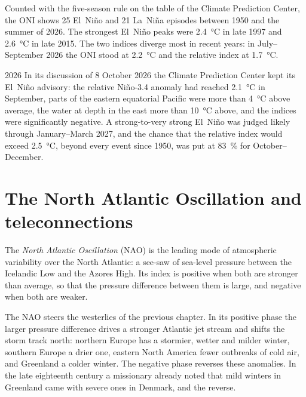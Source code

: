Counted with the five-season rule on the table of the Climate Prediction Center, the ONI shows 25
El~Niño and 21 La~Niña episodes between 1950 and the summer of 2026. The strongest El~Niño
peaks were \qty{2.4}{\celsius} in late 1997 and \qty{2.6}{\celsius} in late 2015. The two indices
diverge most in recent years: in July--September 2026 the ONI stood at \qty{2.2}{\celsius} and
the relative index at \qty{1.7}{\celsius}.

\begin{dated}{2026}
In its discussion of 8 October 2026 the Climate Prediction Center kept its El~Niño advisory: the
relative Niño-3.4 anomaly had reached \qty{+2.1}{\celsius} in September, parts of the eastern
equatorial Pacific were more than \qty{4}{\celsius} above average, the water at depth in the east
more than \qty{10}{\celsius} above, and the  indices were significantly
negative. A
strong-to-very strong El~Niño was judged likely through January--March 2027, and the chance that
the relative index would exceed \qty{2.5}{\celsius}, beyond every event since 1950, was put at
\qty{83}{\percent} for October--December.
\end{dated}

\section{The North Atlantic Oscillation and teleconnections}\label{sec:b2:climate-variability:nao}

\begin{definition}\label{def:b2:climate-variability:nao}
The \emph{North Atlantic Oscillation} (NAO) is the leading mode
of atmospheric variability over the North Atlantic: a see-saw of sea-level pressure between the
Icelandic Low and the Azores High. Its index is positive when both are stronger than average, so
that the pressure difference between them is large, and negative when both are weaker.
\end{definition}

The NAO steers the westerlies of the previous chapter. In its positive phase the larger pressure
difference drives a stronger Atlantic jet stream and shifts the storm track north: northern Europe
has a stormier, wetter and milder winter, southern Europe a drier one, eastern North America
fewer outbreaks of cold air, and Greenland a colder winter. The negative phase reverses these
anomalies. In the late eighteenth century a missionary already noted that mild winters in
Greenland came with severe ones in Denmark, and the reverse.

